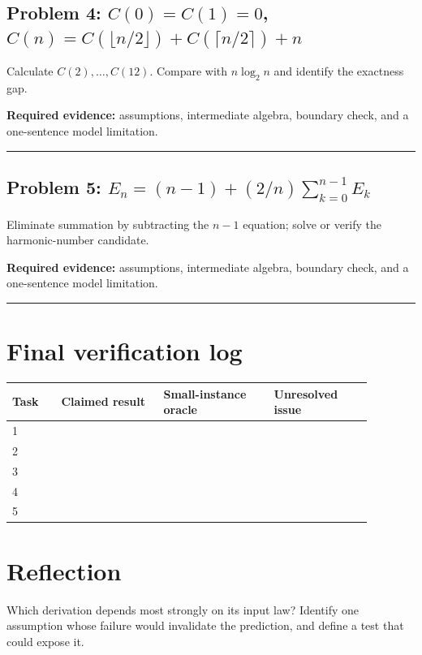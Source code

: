 \documentclass[11pt]{article}
\begin{document}
\subsection{\texorpdfstring{Problem 4: $C(0)=C(1)=0$, $C(n)=C(\lfloor n/2\rfloor)+C(\lceil n/2\rceil)+n$}{Problem 4: Floor-and-ceiling divide-and-conquer recurrence}}
Calculate $C(2),\ldots,C(12)$. Compare with $n\log_2n$ and identify the exactness gap.\par
\textbf{Required evidence:} assumptions, intermediate algebra, boundary check, and a one-sentence model limitation.\par
\vspace{1.2cm}\hrule\vspace{0.4cm}
\subsection{\texorpdfstring{Problem 5: $E_n=(n-1)+(2/n)\sum_{k=0}^{n-1}E_k$}{Problem 5: Expected-cost recurrence with a summation}}
Eliminate summation by subtracting the $n-1$ equation; solve or verify the harmonic-number candidate.\par
\textbf{Required evidence:} assumptions, intermediate algebra, boundary check, and a one-sentence model limitation.\par
\vspace{1.2cm}\hrule\vspace{0.4cm}
\section{Final verification log}
\begin{longtable}{p{0.12\linewidth}p{0.25\linewidth}p{0.27\linewidth}p{0.24\linewidth}}\toprule Task & Claimed result & Small-instance oracle & Unresolved issue \\ \midrule
1 & & & \\ 2 & & & \\ 3 & & & \\ 4 & & & \\ 5 & & & \\ \bottomrule\end{longtable}
\section{Reflection}
Which derivation depends most strongly on its input law? Identify one assumption whose failure would invalidate the prediction, and define a test that could expose it.
\end{document}
